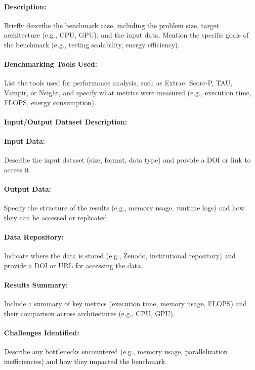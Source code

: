 \paragraph{Description:} Briefly describe the benchmark case, including the problem size, target architecture (e.g., CPU, GPU), and the input data. Mention the specific goals of the benchmark (e.g., testing scalability, energy efficiency).

\paragraph{Benchmarking Tools Used:} List the tools used for performance analysis, such as Extrae, Score-P, TAU, Vampir, or Nsight, and specify what metrics were measured (e.g., execution time, FLOPS, energy consumption).

\paragraph{Input/Output Dataset Description:}
\paragraph{Input Data:} Describe the input dataset (size, format, data type) and provide a DOI or link to access it.

\paragraph{Output Data:} Specify the structure of the results (e.g., memory usage, runtime logs) and how they can be accessed or replicated.

\paragraph{Data Repository:} Indicate where the data is stored (e.g., Zenodo, institutional repository) and provide a DOI or URL for accessing the data.

\paragraph{Results Summary:} Include a summary of key metrics (execution time, memory usage, FLOPS) and their comparison across architectures (e.g., CPU, GPU).

\paragraph{Challenges Identified:} Describe any bottlenecks encountered (e.g., memory usage, parallelization inefficiencies) and how they impacted the benchmark.
\fi

